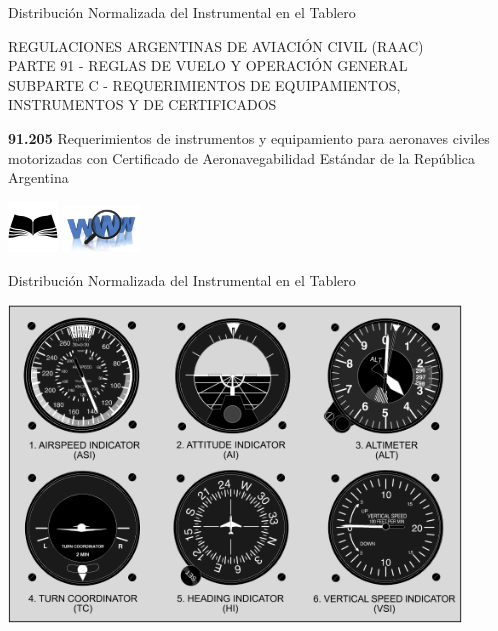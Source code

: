 \documentclass[10pt]{beamer}
\begin{document}
\begin{frame}{Distribuci\'on Normalizada del Instrumental en el
 Tablero}
  

REGULACIONES ARGENTINAS DE AVIACI\'ON CIVIL (RAAC)\\
PARTE 91 - REGLAS DE VUELO Y OPERACI\'ON GENERAL\\
SUBPARTE C - REQUERIMIENTOS DE EQUIPAMIENTOS, INSTRUMENTOS Y DE
CERTIFICADOS\\

\vspace{3mm}

\colorbox{yellow!30}{\parbox{0.9\textwidth}{{\bf 91.205} \qquad
Requerimientos de instrumentos y equipamiento para aeronaves civiles motorizadas con
Certificado de Aeronavegabilidad Est\'andar de la Rep\'ublica Argentina}
}

\href{run:biblio/parte-91-19feb2016-res-77-16.pdf}{\includegraphics[width=0.1\textwidth]{imagenes/libro.png}}
\hspace{3mm}
\href{http://www.anac.gov.ar/anac/web/uploads/normativa/raac/raac_vigentes/por_parte/parte-91-23dic2014.pdf}{\includegraphics[width=0.15\textwidth]{imagenes/www-logo.png}}

\end{frame}

\begin{frame}{Distribuci\'on Normalizada del Instrumental en el
 Tablero}

\includegraphics[width=0.9\textwidth]{imagenes/1.3.distribucion.normalizada.instrumental.en.tablero/6_pack.png}

\end{frame}
\end{document}

